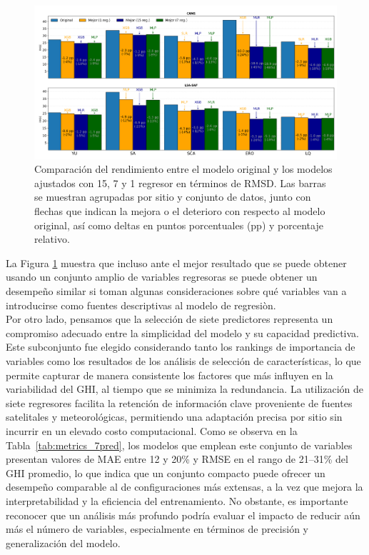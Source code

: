 \begin{figure}
    \centering
    \includegraphics[width=\textwidth]{figuras/rmsd-multiple-mejor.png}
    \caption{Comparación del rendimiento entre el modelo original y los modelos ajustados con 15, 7 y 1 regresor en términos de RMSD. Las barras se muestran agrupadas por sitio y conjunto de datos, junto con flechas que indican la mejora o el deterioro con respecto al modelo original, así como deltas en puntos porcentuales (pp) y porcentaje relativo.}
    \label{fig:rrmsd-multiple}
\end{figure}


La Figura \ref{fig:rrmsd-multiple} muestra que incluso ante el mejor resultado que se puede obtener usando un conjunto amplio de variables regresoras se puede obtener un desempeño similar si toman algunas consideraciones sobre qué variables van a introducirse como fuentes descriptivas al modelo de regresiòn.\\



Por otro lado, pensamos que la selección de siete predictores representa un compromiso adecuado entre la simplicidad del modelo y su capacidad predictiva. Este subconjunto fue elegido considerando tanto los rankings de importancia de variables como los resultados de los análisis de selección de características, lo que permite capturar de manera consistente los factores que más influyen en la variabilidad del GHI, al tiempo que se minimiza la redundancia. La utilización de siete regresores facilita la retención de información clave proveniente de fuentes satelitales y meteorológicas, permitiendo una adaptación precisa por sitio sin incurrir en un elevado costo computacional. Como se observa en la Tabla~\ref{tab:metrics_7pred}, los modelos que emplean este conjunto de variables presentan valores de MAE entre 12 y 20\% y RMSE en el rango de 21–31\% del GHI promedio, lo que indica que un conjunto compacto puede ofrecer un desempeño comparable al de configuraciones más extensas, a la vez que mejora la interpretabilidad y la eficiencia del entrenamiento. No obstante, es importante reconocer que un análisis más profundo podría evaluar el impacto de reducir aún más el número de variables, especialmente en términos de precisión y generalización del modelo.\\












